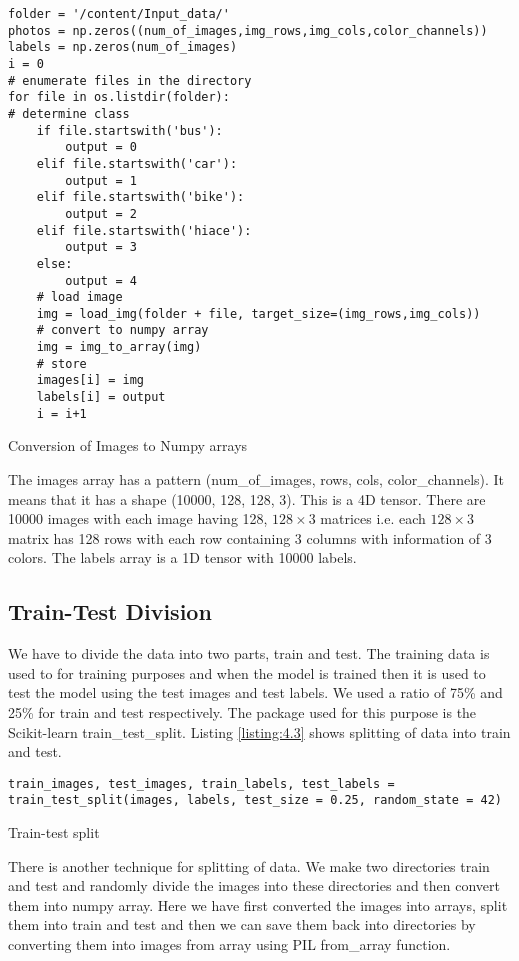 \begin{longlisting}
    \begin{verbatim}
folder = '/content/Input_data/'
photos = np.zeros((num_of_images,img_rows,img_cols,color_channels))
labels = np.zeros(num_of_images)
i = 0
# enumerate files in the directory
for file in os.listdir(folder):
# determine class
    if file.startswith('bus'):
        output = 0
    elif file.startswith('car'):
        output = 1
    elif file.startswith('bike'):
        output = 2
    elif file.startswith('hiace'):
        output = 3
    else:
        output = 4
    # load image
    img = load_img(folder + file, target_size=(img_rows,img_cols))
    # convert to numpy array
    img = img_to_array(img)
    # store
    images[i] = img
    labels[i] = output
    i = i+1
\end{verbatim}
\caption{Conversion of Images to Numpy arrays}
\label{listing:4.2}
\end{longlisting}
The images array has a pattern (num\_of\_images, rows, cols, color\_channels). It
means that it has a shape (10000, 128, 128, 3). This is a 4D tensor. There are 10000
images with each image having 128, $128\times 3$ matrices i.e. each $128\times 3$ matrix has
128 rows with each row containing 3 columns with information of 3 colors.
The labels array is a 1D tensor with 10000 labels.
\subsection{Train-Test Division}
We have to divide the data into two parts, train and test. The training data
is used to for training purposes and when the model is trained then it is
used to test the model using the test images and test labels. We used a ratio of 75\% and
25\% for train and test respectively. The package used for this purpose is the
Scikit-learn train\_test\_split. Listing \ref{listing:4.3} shows splitting of
data into train and test.

\begin{listing}[H]
    \begin{verbatim}
train_images, test_images, train_labels, test_labels = 
train_test_split(images, labels, test_size = 0.25, random_state = 42)
\end{verbatim}
\caption{Train-test split}
\label{listing:4.3}
\end{listing}
There is another technique for splitting of data. We make two directories
train and test and randomly divide the images into these directories and then
convert them into numpy array. Here we have first converted the images
into arrays, split them into train and test and then we can save them back into
directories by converting them into images from array using PIL from\_array
function.

